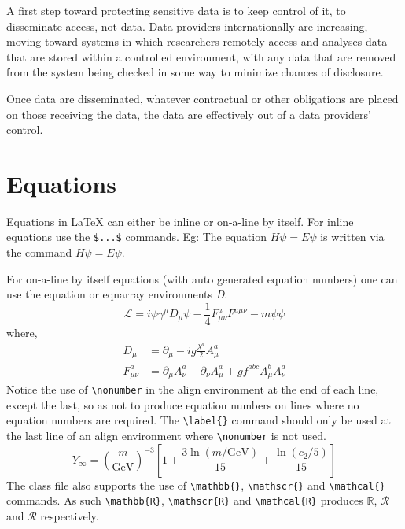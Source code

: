 \documentclass{CUP-JNL-DAP}%
\begin{document}
A first step toward protecting sensitive data is to keep control of it, to disseminate access, not data. Data
providers internationally are increasing, moving toward systems in which researchers remotely access and
analyses data that are stored within a controlled environment, with any data that are removed from the
system being checked in some way to minimize chances of disclosure.

Once data are disseminated, whatever contractual or other obligations are placed on those receiving the
data, the data are effectively out of a data providers' control.


\section{Equations}

Equations in \LaTeX{} can either be inline or on-a-line by itself. For
inline equations use the \verb+$...$+ commands. Eg: The equation
$H\psi = E \psi$ is written via the command $H \psi = E \psi$.

For on-a-line by itself equations (with auto generated equation numbers)
one can use the equation or eqnarray environments \textit{D}.
\begin{equation}
\mathcal{L} = i {\psi} \gamma^\mu D_\mu \psi
    - \frac{1}{4} F_{\mu\nu}^a F^{a\mu\nu} - m {\psi} \psi
\label{eq1}
\end{equation}
where,
\begin{align}
D_\mu &=  \partial_\mu - ig \frac{\lambda^a}{2} A^a_\mu
\nonumber \\
F^a_{\mu\nu} &= \partial_\mu A^a_\nu - \partial_\nu A^a_\mu
    + g f^{abc} A^b_\mu A^a_\nu
\label{eq2}
\end{align}
Notice the use of \verb+\nonumber+ in the align environment at the end
of each line, except the last, so as not to produce equation numbers on
lines where no equation numbers are required. The \verb+\label{}+ command
should only be used at the last line of an align environment where
\verb+\nonumber+ is not used.
\begin{equation}
Y_\infty = \left( \frac{m}{\textrm{GeV}} \right)^{-3}
    \left[ 1 + \frac{3 \ln(m/\textrm{GeV})}{15}
    + \frac{\ln(c_2/5)}{15} \right]
\end{equation}
The class file also supports the use of \verb+\mathbb{}+, \verb+\mathscr{}+ and
\verb+\mathcal{}+ commands. As such \verb+\mathbb{R}+, \verb+\mathscr{R}+
and \verb+\mathcal{R}+ produces $\mathbb{R}$, $\mathscr{R}$ and $\mathcal{R}$
respectively.
\end{document}
